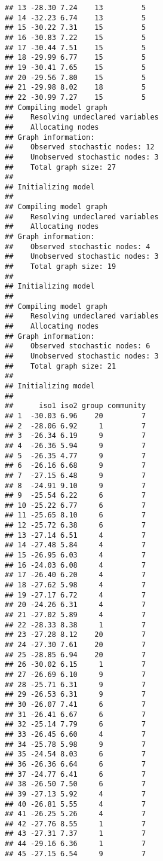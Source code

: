 \documentclass[
]{article}
\begin{document}
\begin{verbatim}
## 13 -28.30 7.24    13         5
## 14 -32.23 6.74    13         5
## 15 -30.22 7.31    15         5
## 16 -30.83 7.22    15         5
## 17 -30.44 7.51    15         5
## 18 -29.99 6.77    15         5
## 19 -30.41 7.65    15         5
## 20 -29.56 7.80    15         5
## 21 -29.98 8.02    18         5
## 22 -30.99 7.27    15         5
## Compiling model graph
##    Resolving undeclared variables
##    Allocating nodes
## Graph information:
##    Observed stochastic nodes: 12
##    Unobserved stochastic nodes: 3
##    Total graph size: 27
## 
## Initializing model
## 
## Compiling model graph
##    Resolving undeclared variables
##    Allocating nodes
## Graph information:
##    Observed stochastic nodes: 4
##    Unobserved stochastic nodes: 3
##    Total graph size: 19
## 
## Initializing model
## 
## Compiling model graph
##    Resolving undeclared variables
##    Allocating nodes
## Graph information:
##    Observed stochastic nodes: 6
##    Unobserved stochastic nodes: 3
##    Total graph size: 21
## 
## Initializing model
## 
##      iso1 iso2 group community
## 1  -30.03 6.96    20         7
## 2  -28.06 6.92     1         7
## 3  -26.34 6.19     9         7
## 4  -26.36 5.94     9         7
## 5  -26.35 4.77     9         7
## 6  -26.16 6.68     9         7
## 7  -27.15 6.48     9         7
## 8  -24.91 9.10     9         7
## 9  -25.54 6.22     6         7
## 10 -25.22 6.77     6         7
## 11 -25.65 8.10     6         7
## 12 -25.72 6.38     6         7
## 13 -27.14 6.51     4         7
## 14 -27.48 5.84     4         7
## 15 -26.95 6.03     4         7
## 16 -24.03 6.08     4         7
## 17 -26.40 6.20     4         7
## 18 -27.62 5.98     4         7
## 19 -27.17 6.72     4         7
## 20 -24.26 6.31     4         7
## 21 -27.02 5.89     4         7
## 22 -28.33 8.38     1         7
## 23 -27.28 8.12    20         7
## 24 -27.30 7.61    20         7
## 25 -28.85 6.94    20         7
## 26 -30.02 6.15     1         7
## 27 -26.69 6.10     9         7
## 28 -25.71 6.31     9         7
## 29 -26.53 6.31     9         7
## 30 -26.07 7.41     6         7
## 31 -26.41 6.67     6         7
## 32 -25.14 7.79     6         7
## 33 -26.45 6.60     4         7
## 34 -25.78 5.98     9         7
## 35 -24.54 8.03     6         7
## 36 -26.36 6.64     6         7
## 37 -24.77 6.41     6         7
## 38 -26.50 7.50     6         7
## 39 -27.13 5.92     4         7
## 40 -26.81 5.55     4         7
## 41 -26.25 5.26     4         7
## 42 -27.76 8.55     1         7
## 43 -27.31 7.37     1         7
## 44 -29.16 6.36     1         7
## 45 -27.15 6.54     9         7

\end{verbatim}
\end{document}
